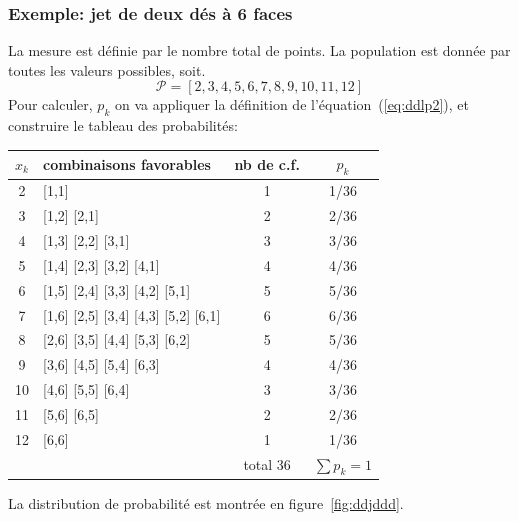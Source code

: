 \subsubsection*{Exemple: jet de deux dés à 6 faces}

La mesure est définie par le nombre total de points. La population est donnée par toutes les valeurs possibles, soit.
$$
    \mathcal{P}=[2,3,4,5,6,7,8,9,10,11,12]
$$
Pour calculer, $p_k$ on va appliquer la définition de l'équation~(\ref{eq:ddlp2}), et construire le tableau des probabilités:
\begin{center}
    \begin{tabular}{clcc}
        $x_k$ & combinaisons favorables             & nb de c.f. & $p_k$        \\\hline
        2     & [1,1]                               & 1          & 1/36         \\
        3     & [1,2] [2,1]                         & 2          & 2/36         \\
        4     & [1,3] [2,2] [3,1]                   & 3          & 3/36         \\
        5     & [1,4] [2,3] [3,2] [4,1]             & 4          & 4/36         \\
        6     & [1,5] [2,4] [3,3] [4,2] [5,1]       & 5          & 5/36         \\
        7     & [1,6] [2,5] [3,4] [4,3] [5,2] [6,1] & 6          & 6/36         \\
        8     & [2,6] [3,5] [4,4] [5,3] [6,2]       & 5          & 5/36         \\
        9     & [3,6] [4,5] [5,4] [6,3]             & 4          & 4/36         \\
        10    & [4,6] [5,5] [6,4]                   & 3          & 3/36         \\
        11    & [5,6] [6,5]                         & 2          & 2/36         \\
        12    & [6,6]                               & 1          & 1/36         \\\hline
              &                                     & total 36   & $\sum p_k=1$
    \end{tabular}
\end{center}
La distribution de probabilité est montrée en figure~\ref{fig:ddjddd}.
